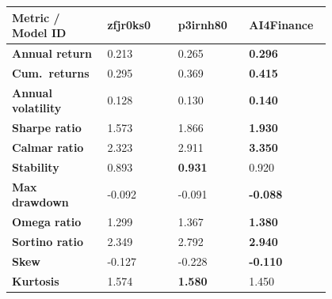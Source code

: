 \documentclass[../xlapes02]{subfiles}
\begin{document}
    \begin{table}[H]
        \centering
        {\footnotesize
            \begin{tabular}{*{4}{|m{0.20\linewidth}|}}
                \toprule
                \bfseries Metric / Model ID & \bfseries zfjr0ks0           & \bfseries p3irnh80            & \bfseries AI4Finance \\[0.2cm]
                \midrule
                \bfseries Annual return       & 0.213                                & 0.265                                 & \color[HTML]{00F000} \bfseries 0.296 \\[0.2cm]
                \bfseries Cum.\ returns       & 0.295                                & 0.369                                 & \color[HTML]{00F000} \bfseries 0.415 \\[0.2cm]
                \bfseries Annual volatility   & 0.128                                & 0.130                                 & \color[HTML]{00F000} \bfseries 0.140 \\[0.2cm]
                \bfseries Sharpe ratio        & 1.573                                & 1.866                                 & \color[HTML]{00F000} \bfseries 1.930 \\[0.2cm]
                \bfseries Calmar ratio        & 2.323                                & 2.911                                 & \color[HTML]{00F000} \bfseries 3.350 \\[0.2cm]
                \bfseries Stability           & 0.893                                & \color[HTML]{00F000} \bfseries 0.931  & 0.920 \\[0.2cm]
                \bfseries Max drawdown        & -0.092                               & -0.091                                & \color[HTML]{00F000} \bfseries -0.088 \\[0.2cm]
                \bfseries Omega ratio         & 1.299                                & 1.367                                 & \color[HTML]{00F000} \bfseries 1.380 \\[0.2cm]
                \bfseries Sortino ratio       & 2.349                                & 2.792                                 & \color[HTML]{00F000} \bfseries 2.940 \\[0.2cm]
                \bfseries Skew                & -0.127                               & -0.228                                & \color[HTML]{00F000} \bfseries -0.110 \\[0.2cm]
                \bfseries Kurtosis            & 1.574                                & \color[HTML]{00F000} \bfseries 1.580  & 1.450 \\[0.2cm]

\end{tabular}}
\end{table}
\end{document}

